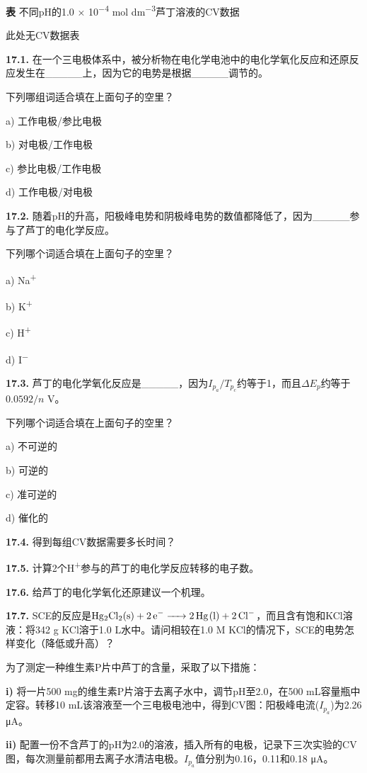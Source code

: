 \textbf{表} 不同pH的1.0 × 10\textsuperscript{−4} mol
dm\textsuperscript{−3}芦丁溶液的CV数据

此处无CV数据表

\noindent\textbf{17.1.}
在一个三电极体系中，被分析物在电化学电池中的电化学氧化反应和还原反应发生在\_\_\_\_\_上，因为它的电势是根据\_\_\_\_\_调节的。

下列哪组词适合填在上面句子的空里？

a) 工作电极/参比电极

b) 对电极/工作电极

c) 参比电极/工作电极

d) 工作电极/对电极

\noindent\textbf{17.2.} 随着pH的升高，阳极峰电势和阴极峰电势的数值都降低了，因为\_\_\_\_\_参与了芦丁的电化学反应。

下列哪个词适合填在上面句子的空里？

a) Na\textsuperscript{+}

b) K\textsuperscript{+}

c) H\textsuperscript{+}

d) I\textsuperscript{−}

\noindent\textbf{17.3.} 芦丁的电化学氧化反应是\_\_\_\_\_，因为$I_{p_a}/T_{p_c}$约等于1，而且$\Delta E_p$约等于$0.0592/n$ V。

下列哪个词适合填在上面句子的空里？

a) 不可逆的

b) 可逆的

c) 准可逆的

d) 催化的

\noindent\textbf{17.4.} 得到每组CV数据需要多长时间？

\noindent\textbf{17.5.} 计算2个H\textsuperscript{+}参与的芦丁的电化学反应转移的电子数。

\noindent\textbf{17.6.} 给芦丁的电化学氧化还原建议一个机理。

\noindent\textbf{17.7.} SCE的反应是$\ce{Hg2Cl2(s) + 2e^- -> 2Hg(l) + 2Cl^-}$，而且含有饱和KCl溶液：将342 g KCl溶于1.0 L水中。请问相较在1.0 M KCl的情况下，SCE的电势怎样变化（降低或升高）？

为了测定一种维生素P片中芦丁的含量，采取了以下措施：

\textbf{i)} 将一片500 mg的维生素P片溶于去离子水中，调节pH至2.0，在500
mL容量瓶中定容。转移10
mL该溶液至一个三电极电池中，得到CV图：阳极峰电流($I_{p_a}$)为2.26
μA。

\textbf{ii)}
配置一份不含芦丁的pH为2.0的溶液，插入所有的电极，记录下三次实验的CV图，每次测量前都用去离子水清洁电极。$I_{p_a}$值分别为0.16，0.11和0.18 μA。

